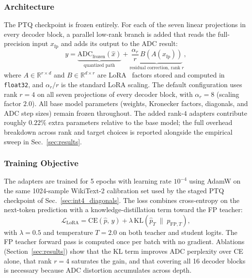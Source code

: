 \documentclass[a4paper,11pt,oneside]{article}
\theoremstyle{breakstyle}
\begin{document}

  \subsubsection{Architecture}

  The PTQ checkpoint is frozen entirely.
  For each of the seven linear projections in every decoder block, a
  parallel low-rank branch is added that reads the full-precision input
  $x_{\mathrm{fp}}$ and adds its output to the ADC result:
  \[
    y = \underbrace{\mathrm{ADC}_{\mathrm{frozen}}(\hat{x})}_{\text{quantized path}}
      + \underbrace{\frac{\alpha_r}{r}\,B\!\left(A\!\left(x_{\mathrm{fp}}\right)\right)}_{\text{residual correction, rank }r},
  \]
  where $A \in \mathbb{R}^{r \times d}$ and $B \in \mathbb{R}^{d \times r}$
  are LoRA~\cite{lora} factors stored and computed in \texttt{float32},
  and $\alpha_r / r$ is the standard LoRA scaling. The default
  configuration uses rank $r = 4$ on all seven projections of every
  decoder block, with $\alpha_r = 8$ (scaling factor $2.0$). All base
  model parameters (weights, Kronecker factors, diagonals, and ADC
  step sizes) remain frozen throughout. The added rank-$4$ adapters
  contribute roughly $0.22\%$ extra parameters relative to the base
  model; the full overhead breakdown across rank and target choices
  is reported alongside the empirical sweep in
  Sec.~\ref{sec:results}.

  \subsubsection{Training Objective}

  The adapters are trained for 5 epochs with learning rate $10^{-4}$
  using AdamW on the same 1024-sample WikiText-2 calibration set used
  by the staged PTQ checkpoint of Sec.~\ref{sec:int4_diagonals}.
  The loss combines cross-entropy on the next-token prediction with a
  knowledge-distillation term toward the FP teacher:
  \[
    \mathcal{L}_{\mathrm{LoRA}} = \mathrm{CE}(\hat{p},\, y)
    + \lambda\,\mathrm{KL}\!\left(\hat{p}_T \;\big\|\; p_{\mathrm{FP},T}\right),
  \]
  with $\lambda = 0.5$ and temperature $T = 2.0$ on both teacher and
  student logits. The FP teacher forward pass is computed once per
  batch with no gradient. Ablations (Section~\ref{sec:results}) show
  that the KL term improves ADC perplexity over CE alone, that rank
  $r = 4$ saturates the gain, and that covering all 16 decoder blocks
  is necessary because ADC distortion accumulates across depth.
\end{document}
